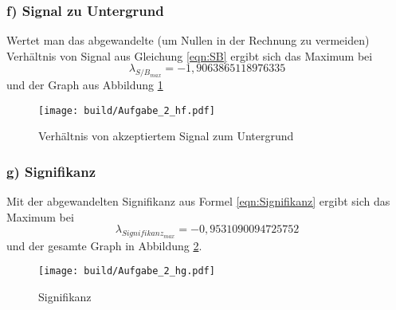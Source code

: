\subsubsection*{f) Signal zu Untergrund}
Wertet man das abgewandelte (um Nullen in der Rechnung zu vermeiden) Verhältnis von Signal aus Gleichung \eqref{eqn:SB}
ergibt sich das Maximum bei
\begin{equation}
    \lambda_{S/B_{max}}=-1,9063865118976335
\end{equation}
und der Graph aus Abbildung \ref{fig:SB_h}
\begin{figure}
  \texttt{[image: build/Aufgabe\_2\_hf.pdf]}
  \caption{Verhältnis von akzeptiertem Signal zum Untergrund}
  \label{fig:SB_h}
\end{figure}

\subsubsection*{g) Signifikanz}
Mit der abgewandelten Signifikanz aus Formel \eqref{eqn:Signifikanz} ergibt sich das Maximum bei
\begin{equation}
    \lambda_{Signifikanz_{max}}=-0,9531090094725752
\end{equation}
und der gesamte Graph in Abbildung \ref{fig:Signifikanz_h}.
\begin{figure}
  \texttt{[image: build/Aufgabe\_2\_hg.pdf]}
  \caption{Signifikanz}
  \label{fig:Signifikanz_h}
\end{figure}
